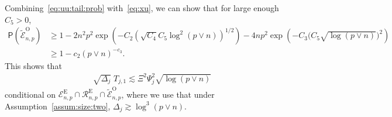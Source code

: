 \documentclass[11pt, a4paper]{article}
\newcommand{\mc}{\mathcal}
\renewcommand{\l}{\left}
\renewcommand{\r}{\right}
\def\wt{\widetilde}
\newcommand{\p}{\mathsf{P}}
\newcommand{\tE}{\text{E}}
\newcommand{\tO}{\text{O}}
\theoremstyle{definition}
\theoremstyle{definition}
\theoremstyle{definition}
\theoremstyle{definition}
\theoremstyle{definition}
\theoremstyle{remark}
\theoremstyle{definition}
\theoremstyle{definition}
\theoremstyle{definition}
\begin{document}
Combining~\eqref{eq:uu:tail:prob} with~\eqref{eq:xu}, we can show that for large enough $C_5 > 0$,
\begin{align*}
\p(\wt{\mc E}^{\tO}_{n, p}) &\ge 1 - 2n^2p^2 \exp\l( - C_2 (\sqrt{C_4} C_5 \log^2(p \vee n))^{1/2} \r) - 4 np^2 \exp\l( - C_3 \bigl(C_5 \sqrt{\log(p \vee n)}\bigr)^2 \r)
\\
&\ge 1 - c_2 (p \vee n)^{-c_3}.
\end{align*}
This shows that
\begin{align*}
\sqrt{\Delta_j} \; T_{j, 1} \lesssim \Xi^2 \Psi_j ^2\sqrt{\log (p \vee n)}
\end{align*}
conditional on $\mc E^{\tE}_{n, p} \cap \mc R^{\tE}_{n, p} \cap \wt{\mc E}^{\tO}_{n, p}$, 
where we use that under Assumption~\ref{assum:size:two}, $\Delta_j \gtrsim \log^3(p \vee n)$.
\end{document}

